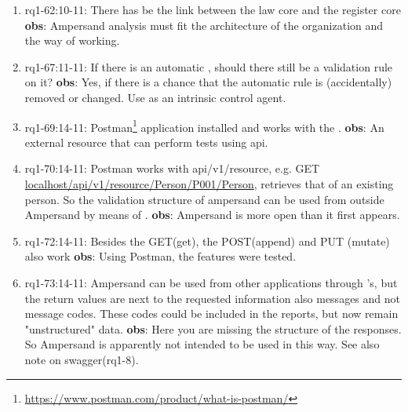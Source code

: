 \begin{enumerate}
    
    \item rq1-62:10-11: There has be the  link between the {law core} and the {register core}
    \newline\textbf{obs}: Ampersand analysis must fit the architecture of the organization and the way of working.
    
    \item rq1-67:11-11: If there is an automatic , should there still be a validation rule on it?
    \newline\textbf{obs}: Yes, if there is a chance that the automatic rule is (accidentally) removed or changed.
    Use as an intrinsic control agent.
    
    
    \item rq1-69:14-11: Postman\footnote{\url{https://www.postman.com/product/what-is-postman/}} application installed and works with the .
    \newline\textbf{obs}: An external resource that can perform tests using api.
    
    \item rq1-70:14-11: Postman works with api/v1/resource, e.g. GET \url{localhost/api/v1/resource/Person/P001/Person}, retrieves that of an existing person.
    So the validation structure of ampersand can be used from outside Ampersand by means of .
    \newline\textbf{obs}: Ampersand is more open than it first appears.
    
    \item rq1-72:14-11: Besides the GET(get), the POST(append) and PUT (mutate) also work
    \newline\textbf{obs}: Using Postman, the  features were tested.
    
    \item rq1-73:14-11: Ampersand can be used from other applications through 's, but the return values are next to the requested information also messages and not message codes.
    These codes could be included in the reports, but now remain "unstructured" data.
    \newline\textbf{obs}: Here you are missing the structure of the responses.
    So Ampersand is apparently not intended to be used in this way.
    See also note on swagger(rq1-8).
    

\end{enumerate}
